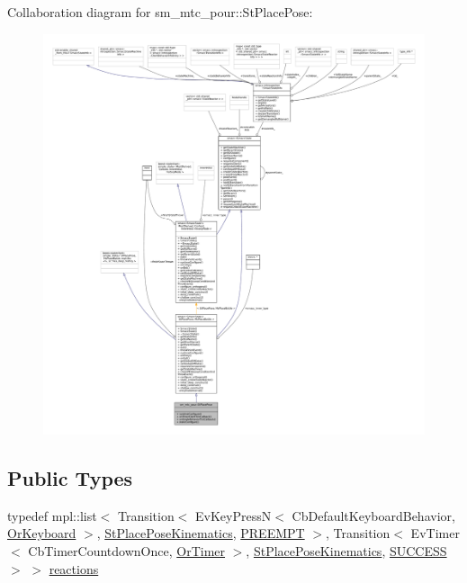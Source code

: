 Collaboration diagram for sm\+\_\+mtc\+\_\+pour\+:\+:St\+Place\+Pose\+:
\nopagebreak
\begin{figure}[H]
\begin{center}
\leavevmode
\includegraphics[width=350pt]{structsm__mtc__pour_1_1StPlacePose__coll__graph}
\end{center}
\end{figure}
\subsection*{Public Types}
\begin{DoxyCompactItemize}
\item 
typedef mpl\+::list$<$ Transition$<$ Ev\+Key\+PressN$<$ Cb\+Default\+Keyboard\+Behavior, \hyperlink{classsm__mtc__pour_1_1OrKeyboard}{Or\+Keyboard} $>$, \hyperlink{structsm__mtc__pour_1_1StPlacePoseKinematics}{St\+Place\+Pose\+Kinematics}, \hyperlink{classPREEMPT}{P\+R\+E\+E\+M\+PT} $>$, Transition$<$ Ev\+Timer$<$ Cb\+Timer\+Countdown\+Once, \hyperlink{classsm__mtc__pour_1_1OrTimer}{Or\+Timer} $>$, \hyperlink{structsm__mtc__pour_1_1StPlacePoseKinematics}{St\+Place\+Pose\+Kinematics}, \hyperlink{classSUCCESS}{S\+U\+C\+C\+E\+SS} $>$ $>$ \hyperlink{structsm__mtc__pour_1_1StPlacePose_aded6568c27639dbb76bb94ad3b964237}{reactions}
\end{DoxyCompactItemize}

